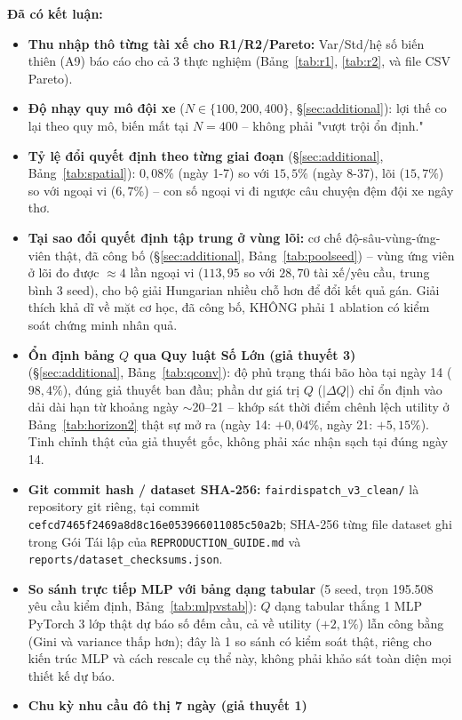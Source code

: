 \documentclass[10pt,twocolumn,a4paper]{article}
\begin{document}
\textbf{Đã có kết luận:}
\begin{itemize}
\item \textbf{Thu nhập thô từng tài xế cho R1/R2/Pareto:} Var/Std/hệ số
biến thiên (A9) báo cáo cho cả 3 thực nghiệm (Bảng~\ref{tab:r1},
\ref{tab:r2}, và file CSV Pareto).
\item \textbf{Độ nhạy quy mô đội xe} ($N\in\{100,200,400\}$,
\S\ref{sec:additional}): lợi thế co lại theo quy mô, biến mất tại
$N{=}400$ -- không phải "vượt trội ổn định."
\item \textbf{Tỷ lệ đổi quyết định theo từng giai đoạn} (\S\ref{sec:additional},
Bảng~\ref{tab:spatial}): $0,08\%$ (ngày 1-7) so với $15,5\%$ (ngày 8-37),
lõi ($15,7\%$) so với ngoại vi ($6,7\%$) -- con số ngoại vi đi ngược câu
chuyện đệm đội xe ngây thơ.
\item \textbf{Tại sao đổi quyết định tập trung ở vùng lõi:} cơ chế
độ-sâu-vùng-ứng-viên thật, đã công bố (\S\ref{sec:additional},
Bảng~\ref{tab:poolseed}) -- vùng ứng viên ở lõi đo được $\approx4$ lần
ngoại vi ($113,95$ so với $28,70$ tài xế/yêu cầu, trung bình 3 seed), cho
bộ giải Hungarian nhiều chỗ hơn để đổi kết quả gán. Giải thích khả dĩ về
mặt cơ học, đã công bố, KHÔNG phải 1 ablation có kiểm soát chứng minh
nhân quả.
\item \textbf{Ổn định bảng $Q$ qua Quy luật Số Lớn (giả thuyết 3)}
(\S\ref{sec:additional}, Bảng~\ref{tab:qconv}): độ phủ trạng thái bão hòa
tại ngày 14 ($98,4\%$), đúng giả thuyết ban đầu; phần dư giá trị $Q$
($|\Delta Q|$) chỉ ổn định vào dải dài hạn từ khoảng ngày $\sim$20--21 --
khớp sát thời điểm chênh lệch utility ở Bảng~\ref{tab:horizon2} thật sự
mở ra (ngày 14: $+0,04\%$, ngày 21: $+5,15\%$). Tinh chỉnh thật của giả
thuyết gốc, không phải xác nhận sạch tại đúng ngày 14.
\item \textbf{Git commit hash / dataset SHA-256:} \texttt{fairdispatch\_v3\_clean/}
là repository git riêng, tại commit
\texttt{cefcd7465f2469a8d8c16e053966011085c50a2b}; SHA-256 từng file
dataset ghi trong Gói Tái lập của \texttt{REPRODUCTION\_GUIDE.md} và
\texttt{reports/dataset\_checksums.json}.
\item \textbf{So sánh trực tiếp MLP với bảng dạng tabular} (5 seed, trọn
195.508 yêu cầu kiểm định, Bảng~\ref{tab:mlpvstab}): $Q$ dạng tabular
thắng 1 MLP PyTorch 3 lớp thật dự báo số đếm cầu, cả về utility
($+2,1\%$) lẫn công bằng (Gini và variance thấp hơn); đây là 1 so sánh có
kiểm soát thật, riêng cho kiến trúc MLP và cách rescale cụ thể này, không
phải khảo sát toàn diện mọi thiết kế dự báo.
\item \textbf{Chu kỳ nhu cầu đô thị 7 ngày (giả thuyết 1)}

\end{itemize}
\end{document}
